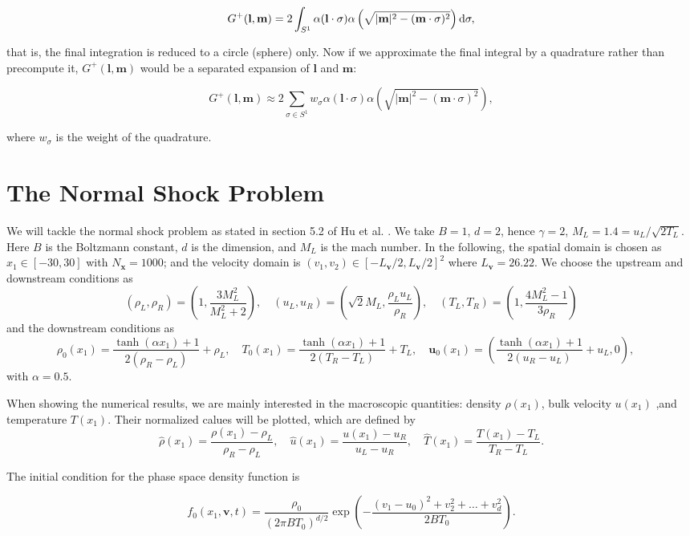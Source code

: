 \documentclass{article}
\def\b{\mathbf}
\def\t{\text}
\def\l{\left}
\def\r{\right}
\begin{document}
\[
    G^+(\b l, \b m) = 2 \int_{S^1} \alpha( \b l \cdot \sigma) \alpha \left( \sqrt{|\b m|^2 - (\b m \cdot \sigma)^2} \right) \t d \sigma,
\]

that is, the final integration is reduced to a circle (sphere) only. Now if we approximate
the final integral by a quadrature rather than precompute it, $G^+(\b l, \b m)$ would be a
separated expansion of $\b l$ and $\b m$:

\[
    G^+(\b l, \b m) \approx 2 \sum_{\sigma \in S^1} w_{\sigma} \alpha( \b l \cdot \sigma) \alpha \left( \sqrt{|\b m|^2 - (\b m \cdot \sigma)^2} \right),
\]

where $w_\sigma$ is the weight of the quadrature.

\section{The Normal Shock Problem}
We will tackle the normal shock problem as stated in section 5.2 of Hu et al. \cite{hu2021adaptive}. We take $B=1$, $d=2$, hence $\gamma=2$, $M_L= 1.4 = u_L / \sqrt{2T_L}$. Here $B$ is the Boltzmann constant, $d$ is the dimension, and $M_L$ is the mach number. In the following, the spatial domain is chosen as $x_1 \in [-30,30]$ with $N_{\b x} = 1000$; and the velocity domain is $(v_1,v_2) \in [-L_{\b v}/2,L_{\b v}/2]^2$ where $L_{\b v} = 26.22$. We choose the upstream and downstream conditions as
\[
    (\rho_L,\rho_R) = \left( 1, \frac{3M_L^2}{M_L^2 + 2}\right), \quad
    (u_L, u_R) = \left(\sqrt{2} M_L, \frac{\rho_L u_L}{\rho_R}\right), \quad
    (T_L, T_R) = \left(1, \frac{4M_L^2 - 1}{3 \rho_R} \right)
\]
and the downstream conditions as
\[
    \rho_0(x_1) = \frac{\tanh(\alpha x_1) + 1}{2(\rho_R - \rho_L)} + \rho_L, \quad
    T_0(x_1) = \frac{\tanh(\alpha x_1) + 1}{2(T_R - T_L)} + T_L, \quad
    \b u_0(x_1) = \left(\frac{\tanh(\alpha x_1) + 1}{2(u_R - u_L)} + u_L, 0 \right), \quad
\]
with $\alpha = 0.5$.

When showing the numerical results, we are mainly interested in the macroscopic quantities: density $\rho(x_1)$, bulk  velocity $u(x_1)$ ,and temperature $T(x_1)$. Their normalized calues will be plotted, which are defined by
\[
    \hat \rho(x_1) = \frac{\rho(x_1) - \rho_L}{\rho_R - \rho_L}, \quad
    \hat u(x_1) = \frac{u(x_1) - u_R}{u_L - u_R}, \quad
    \hat T(x_1) = \frac{T(x_1) - T_L}{T_R - T_L}.
\]

The initial condition for the phase space density function is

\[
    f_0(x_1, \b v, t) = \frac{\rho_0}{(2 \pi B T_0)^{d/2}} \exp \l(- \frac{(v_1 - u_0)^2 + v_2^2 + \hdots + v_d^2}{2 B T_0}\r).
\]
\end{document}
